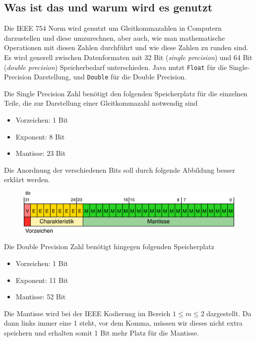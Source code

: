 \subsection{Was ist das und warum wird es genutzt}

Die IEEE 754 Norm wird genutzt um Gleitkommazahlen in Computern darzustellen und diese umzurechnen, aber auch, wie man mathematische Operationen mit diesen Zahlen durchführt und wie diese Zahlen zu runden sind. Es wird generell zwischen Datenformaten mit 32 Bit (\textit{single precision}) und 64 Bit (\textit{double precision}) Speicherbedarf unterschieden. Java nutzt \texttt{Float} für die Single-Precision Darstellung, und \texttt{Double} für die Double Precision. 

Die Single Precision Zahl benötigt den folgenden Speicherplatz für die einzelnen Teile, die zur Darstellung einer Gleitkommazahl notwendig sind

\begin{itemize}
\item Vorzeichen: 1 Bit
\item Exponent: 8 Bit
\item Mantisse: 23 Bit
\end{itemize}

Die Anordnung der verschiedenen Bits soll durch folgende Abbildung besser erklärt werden.

\begin{figure}[htbp!] 
\centering    
\includegraphics[width=1.0\textwidth]{ieee}
\label{fig:ieee}
\end{figure}

Die Double Precision Zahl benötigt hingegen folgenden Speicherplatz

\begin{itemize}
\item Vorzeichen: 1 Bit
\item Exponent: 11 Bit
\item Mantisse: 52 Bit
\end{itemize}

Die Mantisse wird bei der IEEE Kodierung im Bereich $ 1 \le m \le 2 $ dargestellt. Da dann links immer eine 1 steht, vor dem Komma, müssen wir dieses nicht extra speichern und erhalten somit 1 Bit mehr Platz für die Mantisse.

